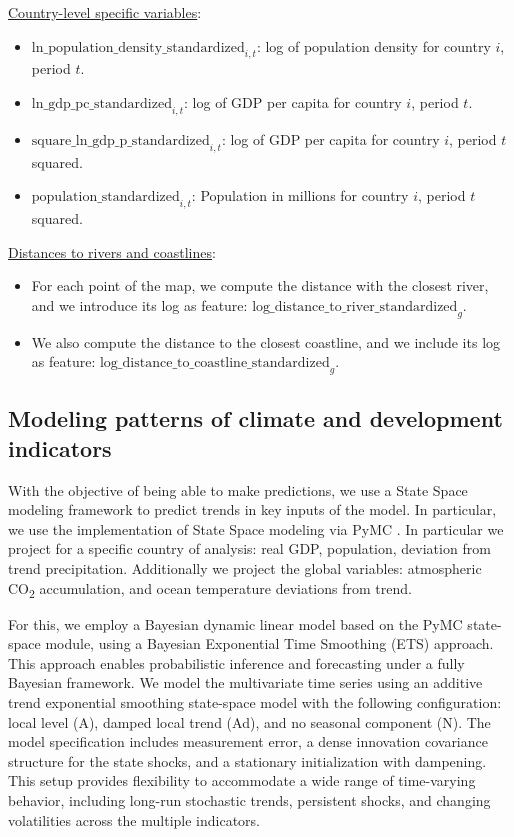 \underline{Country-level specific variables}:
\begin{itemize}
    \item $\text{ln\_population\_density\_standardized}_{i,t}$: log of population density for country $i$, period $t$.
    \item $\text{ln\_gdp\_pc\_standardized}_{i,t}$: log of GDP per capita for country $i$, period $t$.
    \item $\text{square\_ln\_gdp\_p\_standardized}_{i,t}$: log of GDP per capita for country $i$, period $t$ squared.
    \item $\text{population\_standardized}_{i,t}$: Population in millions for country $i$, period $t$ squared.
\end{itemize}

\underline{Distances to rivers and coastlines}:
\begin{itemize}
    \item For each point of the map, we compute the distance with the closest river, and we introduce its log as feature: $\text{log\_distance\_to\_river\_standardized}_{g}$.
    \item We also compute the distance to the closest coastline, and we include its log as feature: $\text{log\_distance\_to\_coastline\_standardized}_{g}$.
\end{itemize}

\subsection{Modeling patterns of climate and development indicators}

With the objective of being able to make predictions, we use a State Space modeling framework to predict trends in key inputs of the model. In particular, we use the implementation of State Space modeling via PyMC \citep{pymc-extras-statespace}. In particular we project for a specific country of analysis: real GDP, population, deviation from trend precipitation. Additionally we project the global variables: atmospheric CO\textsubscript{2} accumulation, and ocean temperature deviations from trend.

For this, we employ a Bayesian dynamic linear model based on the PyMC state-space module, using a Bayesian Exponential Time Smoothing (ETS) \citep{ets_time_series} approach. This approach enables probabilistic inference and forecasting under a fully Bayesian framework. We model the multivariate time series using an additive trend exponential smoothing state-space model with the following configuration: local level (A), damped local trend (Ad), and no seasonal component (N). The model specification includes measurement error, a dense innovation covariance structure for the state shocks, and a stationary initialization with dampening. This setup provides flexibility to accommodate a wide range of time-varying behavior, including long-run stochastic trends, persistent shocks, and changing volatilities across the multiple indicators.

